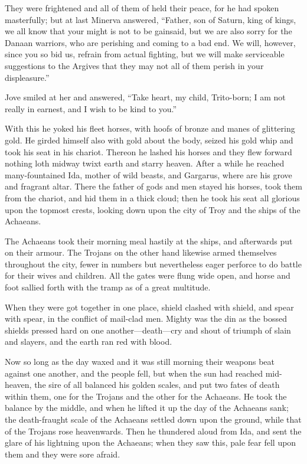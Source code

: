 They were frightened and all of them of held their peace, for he had
spoken masterfully; but at last Minerva answered, “Father, son of Saturn,
king of kings, we all know that your might is not to be gainsaid, but we
are also sorry for the Danaan warriors, who are perishing and coming to a
bad end. We will, however, since you so bid us, refrain from actual
fighting, but we will make serviceable suggestions to the Argives that
they may not all of them perish in your displeasure.”

Jove smiled at her and answered, “Take heart, my child, Trito-born; I am
not really in earnest, and I wish to be kind to you.”

With this he yoked his fleet horses, with hoofs of bronze and manes of
glittering gold. He girded himself also with gold about the body, seized
his gold whip and took his seat in his chariot. Thereon he lashed his
horses and they flew forward nothing loth midway twixt earth and starry
heaven. After a while he reached many-fountained Ida, mother of wild
beasts, and Gargarus, where are his grove and fragrant altar. There the
father of gods and men stayed his horses, took them from the chariot, and
hid them in a thick cloud; then he took his seat all glorious upon the
topmost crests, looking down upon the city of Troy and the ships of the
Achaeans.

The Achaeans took their morning meal hastily at the ships, and afterwards
put on their armour. The Trojans on the other hand likewise armed
themselves throughout the city, fewer in numbers but nevertheless eager
perforce to do battle for their wives and children. All the gates were
flung wide open, and horse and foot sallied forth with the tramp as of a
great multitude.

When they were got together in one place, shield clashed with shield, and
spear with spear, in the conflict of mail-clad men. Mighty was the din as
the bossed shields pressed hard on one another—death—cry and
shout of triumph of slain and slayers, and the earth ran red with blood.

Now so long as the day waxed and it was still morning their weapons beat
against one another, and the people fell, but when the sun had reached
mid-heaven, the sire of all balanced his golden scales, and put two fates
of death within them, one for the Trojans and the other for the Achaeans.
He took the balance by the middle, and when he lifted it up the day of the
Achaeans sank; the death-fraught scale of the Achaeans settled down upon
the ground, while that of the Trojans rose heavenwards. Then he thundered
aloud from Ida, and sent the glare of his lightning upon the Achaeans;
when they saw this, pale fear fell upon them and they were sore afraid.

